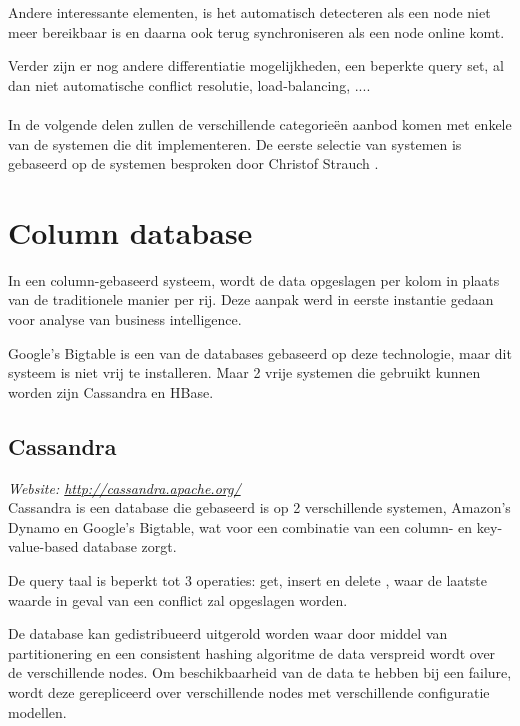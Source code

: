 Andere interessante elementen, is het automatisch detecteren als een node niet meer bereikbaar is en daarna ook terug synchroniseren als een node online komt. 

Verder zijn er nog andere differentiatie mogelijkheden, een beperkte query set, al dan niet automatische conflict resolutie, load-balancing, ....  

\paragraph{} In de volgende delen zullen de verschillende categorieën aanbod komen met enkele van de systemen die dit implementeren. De eerste selectie van systemen is gebaseerd op de systemen besproken door Christof Strauch \cite{Strauch.NoSQL}.

\section{Column database}
In een column-gebaseerd systeem, wordt de data opgeslagen per kolom in plaats van de traditionele manier per rij. Deze aanpak werd in eerste instantie gedaan voor analyse van business intelligence. 

Google's Bigtable is een van de databases gebaseerd op deze technologie, maar dit systeem is niet vrij te installeren. Maar 2 vrije systemen die gebruikt kunnen worden zijn Cassandra en HBase. 


\subsection{Cassandra}
\textit{Website: \url{http://cassandra.apache.org/}}\\
Cassandra is een database die gebaseerd is op 2 verschillende systemen, Amazon's Dynamo en Google's Bigtable, wat voor een combinatie van een column- en key-value-based database zorgt. 

De query taal is beperkt tot 3 operaties: get, insert en delete \cite{Lakshman:2010:CDS:1773912.1773922}, waar de  laatste waarde in geval van een conflict zal opgeslagen worden.

De database kan gedistribueerd uitgerold worden waar door middel van partitionering en een consistent hashing algoritme de data verspreid wordt over de verschillende nodes. Om beschikbaarheid van de data te hebben bij een failure, wordt deze gerepliceerd over verschillende nodes met verschillende configuratie modellen. 

